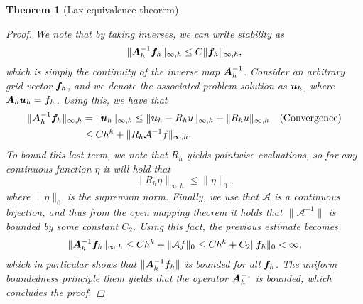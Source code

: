 \documentclass{article}
\renewcommand{\vec}{\vectorsym}
\newcommand{\mat}{\matrixsym}
\newtheorem{theorem}{Theorem}
\begin{document}
\begin{theorem}[Lax equivalence theorem]
\begin{proof}
        We note that by taking inverses, we can write stability as 
        $$ \| \mat A_h^{-1}\vec f_h \|_{\infty, h} \leq C \|\vec f_h\|_{\infty, h}, $$
        which is simply the continuity of the inverse map $\mat A_h^{-1}$. Consider an arbitrary grid vector $\vec f_h$, and we denote the associated problem solution as $\vec u_h$, where $\mat A_h \vec u_h = \vec f_h$. Using this, we have that
        $$ 
        \begin{aligned} 
            \|\mat A_h^{-1}\vec f_h\|_{\infty,h} &= \| \vec u_h \|_{\infty, h} \leq \| \vec u_h - R_h u \|_{\infty, h} + \| R_h u \|_{\infty, h} && \text{(Convergence)}\\
                                                 &\leq C h^k + \| R_h \mathcal A^{-1} f \|_{\infty, h}. 
        \end{aligned}
        $$
        To bound this last term, we note that $R_h$ yields pointwise evaluations, so for any continuous function $\eta$ it will hold that
        $$ \| R_h \eta \|_{\infty,h} \leq \| \eta \|_0, $$
        where $\| \eta \|_0$ is the supremum norm. Finally, we use that $\mathcal A$ is a continuous bijection, and thus from the open mapping theorem it holds that $\|\mathcal A^{-1}\|$ is bounded by some constant $C_2$. Using this fact, the previous estimate becomes 
        $$ \| \mat A_h^{-1} \vec f_h \|_{\infty,h} \leq Ch^k + \| \mathcal A f \|_0 \leq C h^k + C_2 \| \vec f_h \|_0<\infty, $$
        which in particular shows that $ \| \mat A_h^{-1} \vec f_h \|$ is bounded for all $\vec f_h$. The uniform boundedness principle them yields that the operator $\mat A_h^{-1}$ is bounded, which concludes the proof.
    \end{proof}
\end{theorem}
\end{document}
